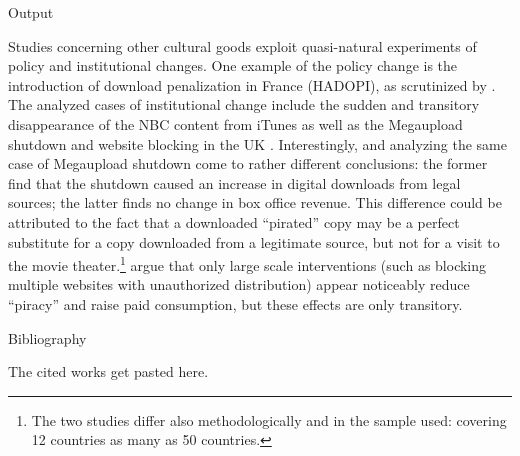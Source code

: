 \documentclass[
  11pt,
  ignorenonframetext,
]{article}
\begin{document}
\begin{frame}[fragile]
\begin{block}{Output}

Studies concerning other cultural goods exploit quasi-natural
experiments of policy and institutional changes. One example of the
policy change is the introduction of download penalization in France
(HADOPI), as scrutinized by \citet{danaher_effect_2012}. The analyzed
cases of institutional change include the sudden and transitory
disappearance of the NBC content from iTunes
\citep[a case unrelated to unauthorized distribution, hence plausibly exogenous, see][]{danaher_converting_2010}
as well as the Megaupload shutdown
\citep{danaher_gone_2014,peukert_piracy_2013} and website blocking in
the UK \citep{danaher_website_2016}. Interestingly,
\citet{danaher_gone_2014} and \citet{peukert_piracy_2013} analyzing the
same case of Megaupload shutdown come to rather different conclusions:
the former find that the shutdown caused an increase in digital
downloads from legal sources; the latter finds no change in box office
revenue. This difference could be attributed to the fact that a
downloaded ``pirated'' copy may be a perfect substitute for a copy
downloaded from a legitimate source, but not for a visit to the movie
theater.\footnote{The two studies  differ also methodologically and in the sample used: \citet{danaher_gone_2014} covering 12 countries \citet{peukert_piracy_2013} as many as 50 countries.}
\citet{danaher_website_2016} argue that only large scale interventions
(such as blocking multiple websites with unauthorized distribution)
appear noticeably reduce ``piracy'' and raise paid consumption, but
these effects are only transitory.

\end{block}

\end{frame}

\begin{frame}{Bibliography}
\protect\hypertarget{bibliography}{}

The cited works get pasted here.

\end{frame}
\end{document}
